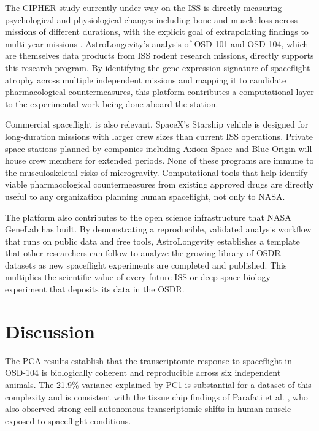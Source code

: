 \documentclass[conference]{IEEEtran}
\begin{document}
The CIPHER study currently under way on the ISS is directly measuring psychological and physiological changes including bone and muscle loss across missions of different durations, with the explicit goal of extrapolating findings to multi-year missions \cite{lloyd2023}. AstroLongevity's analysis of OSD-101 and OSD-104, which are themselves data products from ISS rodent research missions, directly supports this research program. By identifying the gene expression signature of spaceflight atrophy across multiple independent missions and mapping it to candidate pharmacological countermeasures, this platform contributes a computational layer to the experimental work being done aboard the station.

Commercial spaceflight is also relevant. SpaceX's Starship vehicle is designed for long-duration missions with larger crew sizes than current ISS operations. Private space stations planned by companies including Axiom Space and Blue Origin will house crew members for extended periods. None of these programs are immune to the musculoskeletal risks of microgravity. Computational tools that help identify viable pharmacological countermeasures from existing approved drugs are directly useful to any organization planning human spaceflight, not only to NASA.

The platform also contributes to the open science infrastructure that NASA GeneLab has built. By demonstrating a reproducible, validated analysis workflow that runs on public data and free tools, AstroLongevity establishes a template that other researchers can follow to analyze the growing library of OSDR datasets as new spaceflight experiments are completed and published. This multiplies the scientific value of every future ISS or deep-space biology experiment that deposits its data in the OSDR.

\section{Discussion}

The PCA results establish that the transcriptomic response to spaceflight in OSD-104 is biologically coherent and reproducible across six independent animals. The 21.9\% variance explained by PC1 is substantial for a dataset of this complexity and is consistent with the tissue chip findings of Parafati et al. \cite{parafati2023}, who also observed strong cell-autonomous transcriptomic shifts in human muscle exposed to spaceflight conditions.
\end{document}
